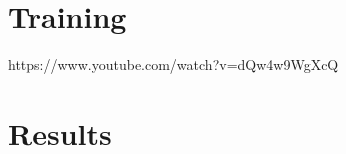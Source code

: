 \documentclass[conference]{IEEEtran}
\begin{document}
\section{Training}
https://www.youtube.com/watch?v=dQw4w9WgXcQ

\section{Results}

\end{document}
